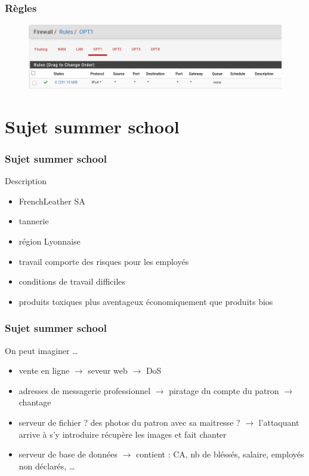 \documentclass{beamer}
\begin{document}
		\begin{frame}
			\frametitle{Règles}
			\begin{center}
				\begin{figure}
					\includegraphics[scale=.3]{rules3.png}
					\caption{}
				\end{figure}
			\end{center}
		\end{frame}
	\section{Sujet summer school}
		\begin{frame}
			\frametitle{Sujet summer school}
			\begin{block}{Description}
				\begin{itemize}
					\item FrenchLeather SA
					\item tannerie
					\item région Lyonnaise
					\item travail comporte des risques pour les employés
					\item conditions de travail difficiles
					\item produits toxiques plus aventageux économiquement que produits bios
				\end{itemize}
			\end{block}
		\end{frame}
		\begin{frame}
			\frametitle{Sujet summer school}
			\begin{block}{On peut imaginer \ldots}
				\begin{itemize}
					\item vente en ligne $\rightarrow$ seveur web $\rightarrow$ DoS
					\item adresses de messagerie professionnel $\rightarrow$ piratage du compte du patron $\rightarrow$ chantage
					\item serveur de fichier ? des photos du patron avec sa maitresse ? $\rightarrow$ l'attaquant arrive à s'y introduire récupère les images et fait chanter
					\item serveur de base de données $\rightarrow$ contient : CA, nb de bléssés, salaire, employés non déclarés, \ldots
				\end{itemize}
			\end{block}
		\end{frame}
\end{document}
